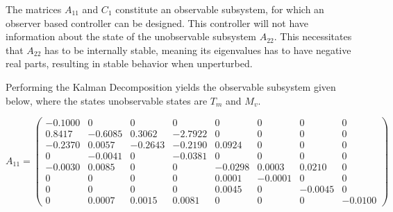 The matrices $A_{11}$ and $C_{1}$ constitute an observable subsystem, for which an observer based controller can be designed. This controller will not have information about the state of the unobservable subsystem $A_{22}$. This necessitates that $A_{22}$ has to be internally stable, meaning its eigenvalues has to have negative real parts, resulting in stable behavior when unperturbed.

Performing the Kalman Decomposition yields the observable subsystem given below, where the states unobservable states are $ T_m $ and $ M_v $. 

\begin{equation}  \label{eq:A11}
	A_{11} = \left(\begin{array}{cccccccc}
			-0.1000 &        0 &        0 &        0 &        0 &        0 &        0 &        0  \\
			0.8417 &  -0.6085 &   0.3062 &  -2.7922 &        0 &        0 &        0 &        0  \\
			-0.2370 &   0.0057 &  -0.2643 &  -0.2190 &   0.0924 &        0 &        0 &        0  \\
			0 &  -0.0041 &        0 &  -0.0381 &        0 &        0 &        0 &        0  \\
			-0.0030 &   0.0085 &        0 &        0 &  -0.0298 &   0.0003 &   0.0210 &        0  \\
			0 &        0 &        0 &        0 &   0.0001 &  -0.0001 &        0 &        0  \\
			0 &        0 &        0 &        0 &   0.0045 &        0 &  -0.0045 &        0  \\
			0 &   0.0007 &   0.0015 &   0.0081 &        0 &        0 &        0 &  -0.0100  
	\end{array}\right)
\end{equation}

\bigskip

